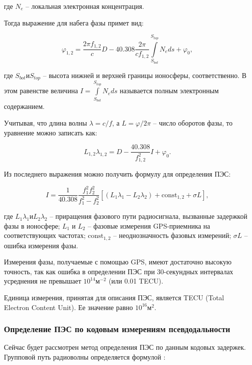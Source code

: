 \documentclass[a4paper]{article}
\begin{document}
где $N_e$ -- локальная электронная концентрация.

Тогда выражение для набега фазы примет вид:

\begin{equation}
\varphi_{1,2} = \frac{2\pi f_{1,2}}{c}D - 40.308\frac{2\pi}{c f_{1,2}}\int\limits_{S_{bot}}^{S_{top}}N_e ds + \varphi_0,
\end{equation}

где $S_{bot} \text{и} S_{top}$ -- высота нижней и верхней границы ионосферы, соответственно. В этом равенстве величина $I = \int\limits_{S_{bot}}^{S_{top}}N_eds$ называется полным электронным содержанием.

Учитывая, что длина волны $\lambda = c / f$, а $L = \varphi / 2\pi$ -- число оборотов фазы, то уравнение можно записать как:

\begin{equation}
L_{1,2} \lambda_{1,2} = D - \frac{40.308}{f_{1,2}^2}I + \varphi_0.
\end{equation}

Из последнего выражения можно получить формулу для определения ПЭС:

\begin{equation}
\label{tecF}
I = \frac{1}{40.308}\frac{f_1^2 f_2^2}{f_1^2 - f_2^2} \left[ \left( L_1\lambda_1 - L_2\lambda_2 \right) + \text{const}_{1,2} + \sigma L \right],
\end{equation}

где $L_1\lambda_1 \text{и} L_2 \lambda_2$ -- приращения фазового пути радиосигнала, вызванные задержкой фазы в ионосфере; $L_1$ и $L_2$ -- фазовые измерения GPS-приемника на соответствующих частотах; $\text{const}_{1,2}$ -- неоднозначность фазовых измерений; $\sigma L$ -- ошибка измерения фазы.

Измерения фазы, получаемые с помощью GPS, имеют достаточно высокую точность, так как ошибка в определении ПЭС при 30-секундных интервалах усреднения не превышает $10^{14} \text{м}^{-2}$ (или 0.01 TECU). 

Единица измерения, принятая для описания ПЭС, является TECU (Total Electron Content Unit). Ее значение равно $10^{16} \text{м}^2$.

\subsubsection{Определение ПЭС по кодовым измерениям псевдодальности}
Сейчас будет рассмотрен метод определения ПЭС  по данным кодовых задержек. Групповой путь радиоволны определяется формулой \cite{devis}:
\end{document}
